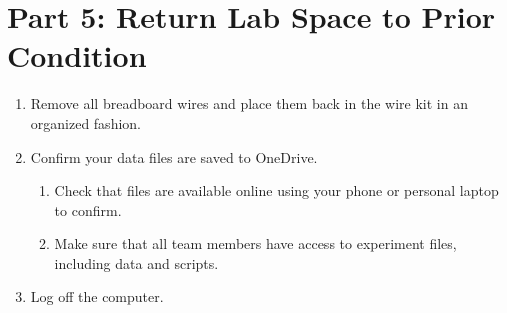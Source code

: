 \documentclass{article} %
\begin{document}
\section{Part 5: Return Lab Space to Prior Condition}
\begin{enumerate}
    \item Remove all breadboard wires and place them back in the wire kit in an organized fashion.
    \item Confirm your data files are saved to OneDrive.
    \begin{enumerate}[label=\alph*.]
        \item Check that files are available online using your phone or personal laptop to confirm.
        \item Make sure that all team members have access to experiment files, including data and scripts.
    \end{enumerate}
    \item Log off the computer.
\end{enumerate}
\end{document}
